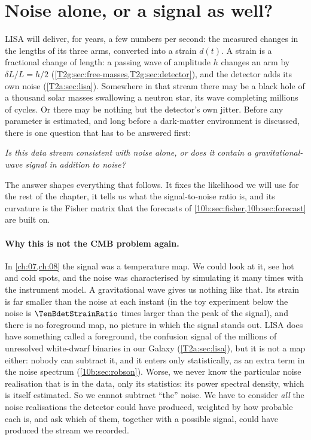 \section{Noise alone, or a signal as well?}
\label{10b:sec:detection}

LISA will deliver, for years, a few numbers per second: the measured changes in the lengths of its three
arms, converted into a strain $d(t)$. A strain is a fractional change of length: a passing wave of amplitude $h$
changes an arm by $\delta L/L=h/2$ (\cref{T2g:sec:free-masses,T2g:sec:detector}), and the detector adds its own noise
(\cref{T2a:sec:lisa}). Somewhere in that stream there may be a black hole
of a thousand solar masses swallowing a neutron star, its wave completing millions of cycles. Or there may be
nothing but the detector's own jitter. Before any parameter is estimated, and long before a dark-matter
environment is discussed, there is one question that has to be answered first:
\begin{center}
\emph{Is this data stream consistent with noise alone, or does it contain a gravitational-wave signal in
addition to noise?}
\end{center}
The answer shapes everything that follows. It fixes the likelihood we will use for the rest of the chapter, it
tells us what the signal-to-noise ratio is, and its curvature is the Fisher matrix that the forecasts of
\cref{10b:sec:fisher,10b:sec:forecast} are built on.

\paragraph{Why this is not the CMB problem again.}
In \cref{ch:07,ch:08} the signal was a temperature map. We could look at it, see hot and cold spots, and the
noise was characterised by simulating it many times with the instrument model. A gravitational wave gives us
nothing like that. Its strain is far smaller than the noise at each instant (in the toy experiment below the
noise is $\TenBdetStrainRatio$ times larger than the peak of the signal), and there is no foreground map, no
picture in which the signal stands out. LISA does have something called a foreground, the confusion signal of the millions of
unresolved white-dwarf binaries in our Galaxy (\cref{T2a:sec:lisa}), but it is not a map either: nobody can subtract it, and it enters only
statistically, as an extra term in the noise spectrum (\cref{10b:sec:robson}). Worse, we never know the particular noise realisation that is in the
data, only its statistics: its power spectral density, which is itself estimated. So we cannot subtract
``the'' noise. We have to consider \emph{all} the noise realisations the detector could have produced,
weighted by how probable each is, and ask which of them, together with a possible signal, could have produced
the stream we recorded.

